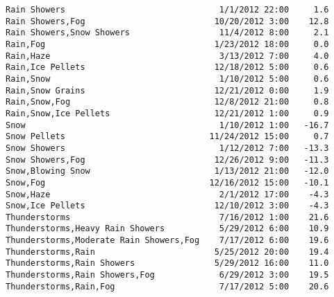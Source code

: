 \documentclass[11pt]{article}
\begin{document}
\begin{tcolorbox}[breakable, size=fbox, boxrule=.5pt, pad at break*=1mm, opacityfill=0]
\begin{Verbatim}[commandchars=\\\{\}]
Rain Showers                               1/1/2012 22:00     1.6
Rain Showers,Fog                          10/20/2012 3:00    12.8
Rain Showers,Snow Showers                  11/4/2012 8:00     2.1
Rain,Fog                                  1/23/2012 18:00     0.0
Rain,Haze                                  3/13/2012 7:00     4.0
Rain,Ice Pellets                          12/18/2012 5:00     0.6
Rain,Snow                                  1/10/2012 5:00     0.6
Rain,Snow Grains                          12/21/2012 0:00     1.9
Rain,Snow,Fog                             12/8/2012 21:00     0.8
Rain,Snow,Ice Pellets                     12/21/2012 1:00     0.9
Snow                                       1/10/2012 1:00   -16.7
Snow Pellets                             11/24/2012 15:00     0.7
Snow Showers                               1/12/2012 7:00   -13.3
Snow Showers,Fog                          12/26/2012 9:00   -11.3
Snow,Blowing Snow                         1/13/2012 21:00   -12.0
Snow,Fog                                 12/16/2012 15:00   -10.1
Snow,Haze                                  2/1/2012 17:00    -4.3
Snow,Ice Pellets                          12/10/2012 3:00    -4.3
Thunderstorms                              7/16/2012 1:00    21.6
Thunderstorms,Heavy Rain Showers           5/29/2012 6:00    10.9
Thunderstorms,Moderate Rain Showers,Fog    7/17/2012 6:00    19.6
Thunderstorms,Rain                        5/25/2012 20:00    19.4
Thunderstorms,Rain Showers                5/29/2012 16:00    11.0
Thunderstorms,Rain Showers,Fog             6/29/2012 3:00    19.5
Thunderstorms,Rain,Fog                     7/17/2012 5:00    20.6


\end{Verbatim}
\end{tcolorbox}
\end{document}
